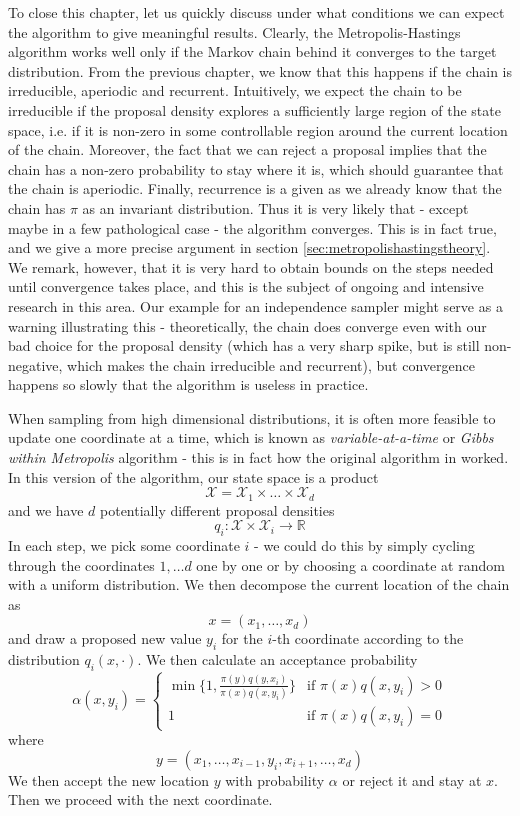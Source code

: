 \documentclass[a4paper, draft]{article}
\theoremstyle{own}
\theoremstyle{remark}
\newcommand{\R}{\mathbb{R}}
\begin{document}
To close this chapter, let us quickly discuss under what conditions we can expect the algorithm to give meaningful results. Clearly, the Metropolis-Hastings algorithm works well only if the Markov chain behind it converges to the target distribution. From the previous chapter, we know that this happens if the chain is irreducible, aperiodic and recurrent. Intuitively, we expect the chain to be irreducible if the proposal density explores a sufficiently large region of the state space, i.e. if it is non-zero in some controllable region around the current location of the chain. Moreover, the fact that we can reject a proposal implies that the chain has a non-zero probability to stay where it is, which should guarantee that the chain is aperiodic. Finally, recurrence is a given as we already know that the chain has $\pi$ as an invariant distribution. Thus it is very likely that - except maybe in a few pathological case - the algorithm converges. This is in fact true, and we give a more precise argument in section \ref{sec:metropolishastingstheory}. We remark, however, that it is very hard to obtain bounds on the steps needed until convergence takes place, and this is the subject of ongoing and intensive research in this area. Our example for an independence sampler might serve as a warning illustrating this - theoretically, the chain does converge even with our bad choice for the proposal density (which has a very sharp spike, but is still non-negative, which makes the chain irreducible and recurrent), but convergence happens so slowly that the algorithm is useless in practice.

When sampling from high dimensional distributions, it is often more feasible to update one coordinate at a time, which is known as {\em variable-at-a-time} or {\em Gibbs within Metropolis} algorithm - this is in fact how the original algorithm in \cite{Metropolis1953} worked. In this version of the algorithm, our state space is a product
$$
{\mathcal X} = {\mathcal X}_1 \times \dots \times {\mathcal X}_d
$$
and we have $d$ potentially different proposal densities
$$
q_i \colon {\mathcal X} \times {\mathcal X}_i \rightarrow \R
$$
In each step, we pick some coordinate $i$ - we could do this by simply cycling through the coordinates $1, \dots d$ one by one or by choosing a coordinate at random with a uniform distribution. We then decompose the current location of the chain as
$$
x = (x_1, \dots, x_d)
$$
and draw a proposed new value $y_i$ for the $i$-th coordinate according to the distribution $q_i(x, \cdot)$. We then calculate an acceptance probability 
$$
\alpha(x,y_i) = 
\begin{cases}
\min \{ 1, \frac{\pi(y)q(y,x_i)}{\pi(x)q(x,y_i)} \} & \text{if } \pi(x) q(x,y_i) > 0 \\
1 & \text{if } \pi(x) q(x,y_i) = 0 
\end{cases}
$$
where 
$$
y = (x_1, \dots, x_{i-1}, y_i, x_{i+1}, \dots, x_d)
$$
We then accept the new location $y$ with probability $\alpha$ or reject it and stay at $x$. Then we proceed with the next coordinate.
\end{document}
